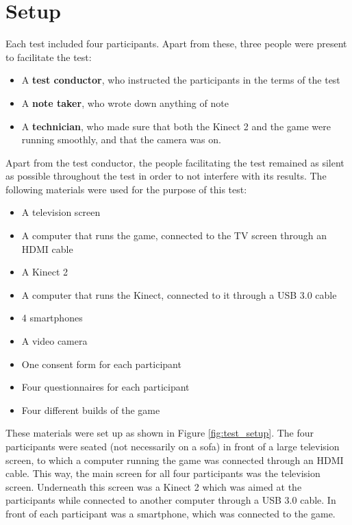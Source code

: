 \section{Setup}
Each test included four participants. Apart from these, three people were present to facilitate the test:

\begin{itemize}
	\item A \textbf{test conductor}, who instructed the participants in the terms of the test
	\item A \textbf{note taker}, who wrote down anything of note
	\item A \textbf{technician}, who made sure that both the Kinect 2 and the game were running smoothly, and that the camera was on.
\end{itemize}

Apart from the test conductor, the people facilitating the test remained as silent as possible throughout the test in order to not interfere with its results. The following materials were used for the purpose of this test:

\begin{itemize}
	\item A television screen
	\item A computer that runs the game, connected to the TV screen through an HDMI cable
	\item A Kinect 2
	\item A computer that runs the Kinect, connected to it through a USB 3.0 cable
	\item 4 smartphones
	\item A video camera
	\item One consent form for each participant
	\item Four questionnaires for each participant
	\item Four different builds of the game
\end{itemize}

These materials were set up as shown in Figure \ref{fig:test_setup}. The four participants were seated (not necessarily on a sofa) in front of a large television screen, to which a computer running the game was connected through an HDMI cable. This way, the main screen for all four participants was the television screen. Underneath this screen was a Kinect 2 which was aimed at the participants while connected to another computer through a USB 3.0 cable. In front of each participant was a smartphone, which was connected to the game.

